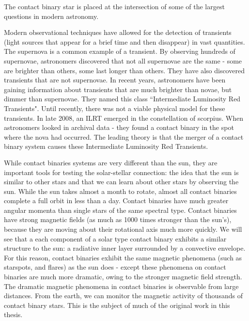 \documentclass[12pt]{article} %
\numberwithin{equation}{section} %
\begin{document}
The contact binary star is placed at the intersection of some of the largest questions in modern astronomy. 

Modern observational techniques have allowed for the detection of transients (light sources that appear for a brief time and then disappear) in vast quantities. The supernova  is a common example of a transient. By observing hundreds of supernovae, astronomers discovered that not all supernovae are the same - some are brighter than others, some last longer than others. They have also discovered transients that are not supernovae. In recent years, astronomers have been gaining information about transients that are much brighter than novae, but dimmer than supernovae. They named this class ``Intermediate Luminosity Red Transients". Until recently, there was not a viable physical model for these transients. In late 2008, an ILRT emerged in the constellation of scorpius. When astronomers looked in archival data - they found a contact binary in the spot where the nova had occurred. The leading theory is that the merger of a contact binary system causes these Intermediate Luminosity Red Transients.

While contact binaries systems are very different than the sun, they are important tools for testing the solar-stellar connection: the idea that the sun is similar to other stars and that we can learn about other stars by observing the sun. While the sun takes almost a month to rotate, almost all contact binaries complete a full orbit in less than a day. Contact binaries have much greater angular momenta than single stars of the same spectral type. Contact binaries have strong magnetic fields (as much as 1000 times stronger than the sun's), because they are moving about their rotational axis much more quickly. We will see that a each component of a solar type contact binary exhibits a similar structure to the sun: a radiative inner layer surrounded by a convective envelope. For this reason, contact binaries exhibit the same magnetic phenomena (such as starspots, and flares) as the sun does - except these phenomena on contact binaries are much more dramatic, owing to the stronger magnetic field strength. The dramatic magnetic phenomena in contact binaries is observable from large distances. From the earth, we can monitor the magnetic activity of thousands of contact binary stars. This is the subject of much of the original work in this thesis.
\end{document}

